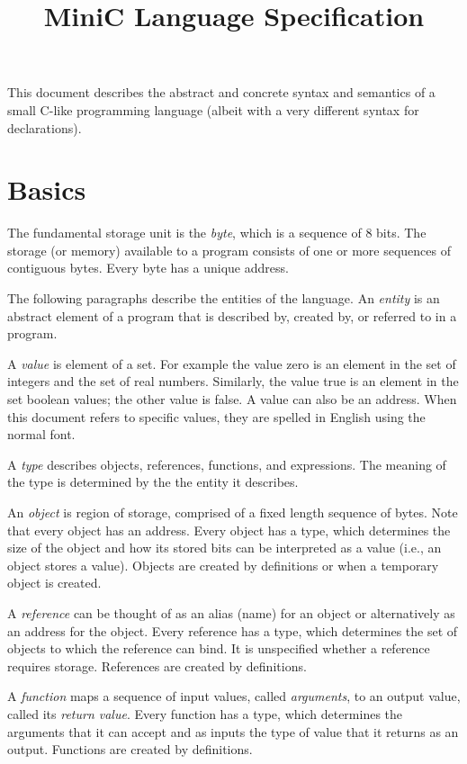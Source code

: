 \documentclass[11pt]{article}
\title{MiniC Language Specification}
\begin{document}
\maketitle

This document describes the abstract and concrete syntax and semantics of a small C-like programming language (albeit with a very different syntax for declarations).

\section{Basics}

The fundamental storage unit is the \emph{byte}, which is a sequence of 8 bits.
The storage (or memory) available to a program consists of one or more sequences of contiguous bytes. 
Every byte has a unique address.

The following paragraphs describe the entities of the language. An \emph{entity} is an abstract element of a program that is described by, created by, or
referred to in a program.

A \emph{value} is element of a set.
For example the value zero is an element in the set of integers and the set of real numbers.
Similarly, the value true is an element in the set boolean values; the other value is false.
A value can also be an address.
When this document refers to specific values, they are spelled in English using the normal font.

A \emph{type} describes objects, references, functions, and expressions.
The meaning of the type is determined by the the entity it describes.

An \emph{object} is region of storage, comprised of a fixed length sequence
of bytes.
Note that every object has an address.
Every object has a type, which determines the size of the object and how its stored bits can be interpreted as a value (i.e., an object stores a value).
Objects are created by definitions or when a temporary object is created.

A \emph{reference} can be thought of as an alias (name) for an object or alternatively as an address for the object.
Every reference has a type, which determines the set of objects to which the reference can bind.
It is unspecified whether a reference requires storage.
References are created by definitions.

A \emph{function} maps a sequence of input values, called \emph{arguments},
to an output value, called its \emph{return value}.
Every function has a type, which determines the arguments that it can accept and as inputs the type of value that it returns as an output.
Functions are created by definitions.
\end{document}
